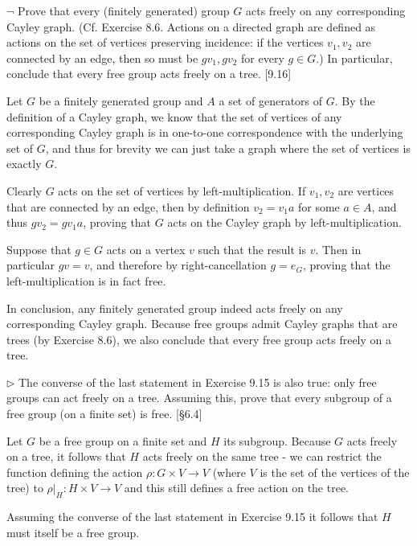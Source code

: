 \begin{problem}
	$\neg$ Prove that every (finitely generated) group $G$ acts freely on any corresponding Cayley graph. (Cf. Exercise 8.6. Actions on a directed graph are defined as actions on the set of vertices preserving incidence: if the vertices $v_1, v_2$ are connected by an edge, then so must be $gv_1, gv_2$ for every $g \in G$.) In particular, conclude that every free group acts freely on a tree. [9.16]
\end{problem}

\begin{solution}
	Let $G$ be a finitely generated group and $A$ a set of generators of $G$. By the definition of a Cayley graph, we know that the set of vertices of any corresponding Cayley graph is in one-to-one correspondence with the underlying set of $G$, and thus for brevity we can just take a graph where the set of vertices is exactly $G$.
	
	Clearly $G$ acts on the set of vertices by left-multiplication. If $v_1, v_2$ are vertices that are connected by an edge, then by definition $v_2 = v_1 a$ for some $a \in A$, and thus $g v_2 = g v_1 a$, proving that $G$ acts on the Cayley graph by left-multiplication.
	
	Suppose that $g \in G$ acts on a vertex $v$ such that the result is $v$. Then in particular $gv = v$, and therefore by right-cancellation $g = e_G$, proving that the left-multiplication is in fact free.
	
	In conclusion, any finitely generated group indeed acts freely on any corresponding Cayley graph. Because free groups admit Cayley graphs that are trees (by Exercise 8.6), we also conclude that every free group acts freely on a tree.
\end{solution}

\begin{problem}
	$\triangleright$ The converse of the last statement in Exercise 9.15 is also true: only free groups can act freely on a tree. Assuming this, prove that every subgroup of a free group (on a finite set) is free. [\S 6.4]
\end{problem}

\begin{solution}
	Let $G$ be a free group on a finite set and $H$ its subgroup. Because $G$ acts freely on a tree, it follows that $H$ acts freely on the same tree - we can restrict the function defining the action $\rho: G \times V \to V$ (where $V$ is the set of the vertices of the tree) to $\rho|_H: H \times V \to V$ and this still defines a free action on the tree.
	
	Assuming the converse of the last statement in Exercise 9.15 it follows that $H$ must itself be a free group.
\end{solution}

